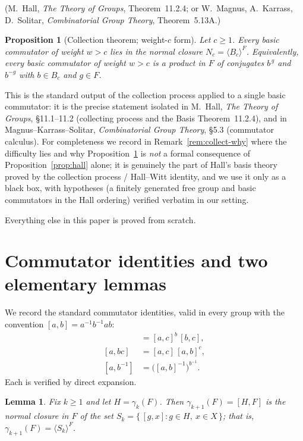 \documentclass{amsart}
\newtheorem{lemma}{Lemma}
\newtheorem{proposition}{Proposition}
\theoremstyle{definition}
\theoremstyle{remark}
\begin{document}
\noindent
(M.\ Hall, \emph{The Theory of Groups}, Theorem~11.2.4; or
W.\ Magnus, A.\ Karrass, D.\ Solitar, \emph{Combinatorial Group Theory},
Theorem~5.13A.)

\begin{proposition}[Collection theorem; weight-$c$ form]\label{prop:collect}
Let $c\ge 1$. Every basic commutator of weight $w>c$ lies in the normal closure
$N_c=\langle B_c\rangle^{F}$. Equivalently, every basic commutator of weight
$w>c$ is a product in $F$ of conjugates $b^{\,g}$ and $b^{-g}$ with $b\in B_c$ and
$g\in F$.
\end{proposition}

\noindent
This is the standard output of the collection process applied to a single basic
commutator: it is the precise statement isolated in
M.\ Hall, \emph{The Theory of Groups}, \S11.1--11.2 (collecting process and the
Basis Theorem~11.2.4), and in
Magnus--Karrass--Solitar, \emph{Combinatorial Group Theory}, \S5.3
(commutator calculus). For completeness we record in
Remark~\ref{rem:collect-why} where the difficulty lies and why
Proposition~\ref{prop:collect} is \emph{not} a formal consequence of
Proposition~\ref{prop:hall} alone; it is genuinely the part of Hall's basis theory
proved by the collection process / Hall--Witt identity, and we use it only as a
black box, with hypotheses (a finitely generated free group and basic commutators
in the Hall ordering) verified verbatim in our setting.

Everything else in this paper is proved from scratch.

\section{Commutator identities and two elementary lemmas}

We record the standard commutator identities, valid in every group with the
convention $[a,b]=a^{-1}b^{-1}ab$:
\begin{align}
[ab,c]&=[a,c]^{b}\,[b,c], \label{eq:id1}\\
[a,bc]&=[a,c]\,[a,b]^{c}, \label{eq:id2}\\
[a,b^{-1}]&=\big([a,b]^{-1}\big)^{b^{-1}}. \label{eq:id3}
\end{align}
Each is verified by direct expansion.

\begin{lemma}\label{lem:gen}
Fix $k\ge 1$ and let $H=\gamma_k(F)$. Then $\gamma_{k+1}(F)=[H,F]$ is the normal
closure in $F$ of the set $S_k=\{\,[g,x] : g\in H,\ x\in X\,\}$; that is,
$\gamma_{k+1}(F)=\langle S_k\rangle^{F}$.
\end{lemma}
\end{document}
